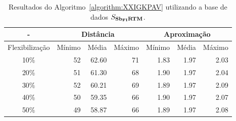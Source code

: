 \begin{table}[!htb]
  \caption{Resultados do Algoritmo~\ref{algorithm:XXIGKPAV} utilizando a base de dados $S_{\textbf{Sb\textsubscript{FI}RTM}}{}$.}
  \label{table:EXRPXQLG}
  \centering
  \begin{tabular}{|c|r|r|r|r|r|r|}
    \hline
      -            & \multicolumn{3}{c|}{Distância}             & \multicolumn{3}{c|}{Aproximação}           \\ \hline
    Flexibilização & Mínimo       & Média        & Máximo       & Mínimo       & Média        & Máximo       \\ \hline  
    10\%           & 52           & 62.60        & 71           & 1.83         & 1.97         & 2.03         \\ \hline
    20\%           & 51           & 61.30        & 68           & 1.90         & 1.97         & 2.04         \\ \hline
    30\%           & 52           & 60.21        & 69           & 1.89         & 1.97         & 2.09         \\ \hline
    40\%           & 50           & 59.35        & 66           & 1.90         & 1.97         & 2.07         \\ \hline
    50\%           & 49           & 58.87        & 66           & 1.89         & 1.97         & 2.08         \\ \hline    
  \end{tabular}
\end{table}